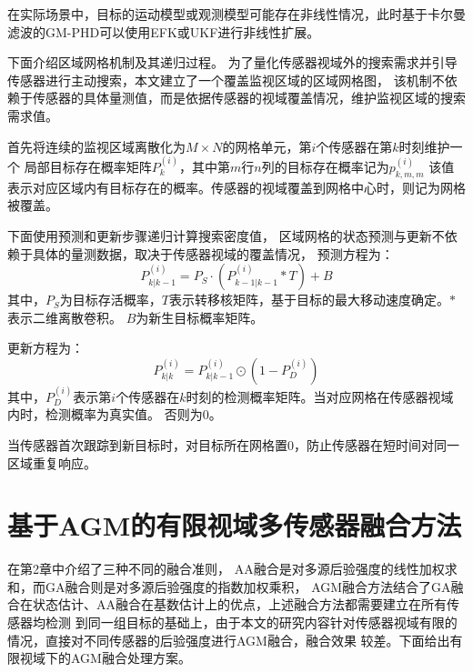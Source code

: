 在实际场景中，目标的运动模型或观测模型可能存在非线性情况，此时基于卡尔曼滤波的GM-PHD可以使用EFK或UKF进行非线性扩展。

下面介绍区域网格机制及其递归过程。
为了量化传感器视域外的搜索需求并引导传感器进行主动搜索，本文建立了一个覆盖监视区域的区域网格图，
该机制不依赖于传感器的具体量测值，而是依据传感器的视域覆盖情况，维护监视区域的搜索需求值。

首先将连续的监视区域离散化为$M\times N$的网格单元，第$i$个传感器在第$k$时刻维护一个
局部目标存在概率矩阵$P_k^{(i)}$，其中第$m$行$n$列的目标存在概率记为$p_{k,m,m}^{(i)}$
该值表示对应区域内有目标存在的概率。传感器的视域覆盖到网格中心时，则记为网格被覆盖。

下面使用预测和更新步骤递归计算搜索密度值，
区域网格的状态预测与更新不依赖于具体的量测数据，取决于传感器视域的覆盖情况，
预测方程为：
\begin{equation}
    P_{k|k-1}^{(i)}=P_S\cdot\left(P_{k-1|k-1}^{(i)}*T\right)+B
    \label{eq:预测搜索值}
\end{equation}
其中，$P_S$为目标存活概率，$T$表示转移核矩阵，基于目标的最大移动速度确定。$*$表示二维离散卷积。
$B$为新生目标概率矩阵。

更新方程为：
\begin{equation}
    P_{k|k}^{(i)}=P_{k|k-1}^{(i)}\odot\left(1-P_D^{(i)}\right)
    \label{eq:更新搜索值}
\end{equation}
其中，$P_D^{(i)}$表示第$i$个传感器在$k$时刻的检测概率矩阵。当对应网格在传感器视域内时，检测概率为真实值。
否则为0。

当传感器首次跟踪到新目标时，对目标所在网格置0，防止传感器在短时间对同一区域重复响应。

\section{基于AGM的有限视域多传感器融合方法}
在第2章中介绍了三种不同的融合准则，
AA融合是对多源后验强度的线性加权求和，而GA融合则是对多源后验强度的指数加权乘积，
AGM融合方法结合了GA融合在状态估计、AA融合在基数估计上的优点，上述融合方法都需要建立在所有传感器均检测
到同一组目标的基础上，由于本文的研究内容针对传感器视域有限的情况，直接对不同传感器的后验强度进行AGM融合，融合效果
较差。下面给出有限视域下的AGM融合处理方案。

